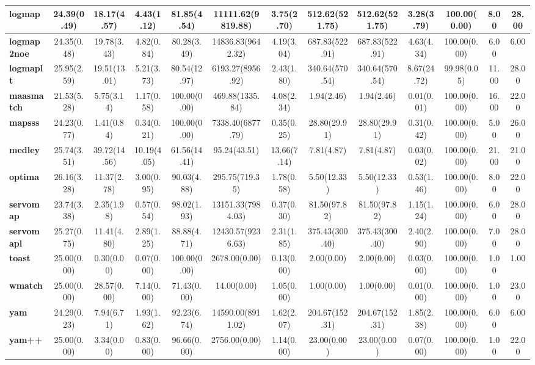 \begin{tabular}{|l|c|c|c|c|c|c|c|c|c|c|c|c|}
\textbf{logmap}&24.39(0.49)&18.17(4.57)&4.43(1.12)&81.85(4.54)&11111.62(9819.88)&3.75(2.70)&512.62(521.75)&512.62(521.75)&3.28(3.79)&100.00(0.00)&8.00&28.00\\\hline
\textbf{logmap2noe}&24.35(0.48)&19.78(3.43)&4.82(0.84)&80.28(3.49)&14836.83(9642.32)&4.19(3.04)&687.83(522.91)&687.83(522.91)&4.63(4.34)&100.00(0.00)&6.00&6.00\\\hline
\textbf{logmaplt}&25.95(2.59)&19.51(13.01)&5.21(3.73)&80.54(12.97)&6193.27(8956.92)&2.43(1.80)&340.64(570.54)&340.64(570.54)&8.67(24.72)&99.98(0.05)&11.00&28.00\\\hline
\textbf{maasmatch}&21.53(5.28)&5.75(3.14)&1.17(0.58)&100.00(0.00)&469.88(1335.84)&4.08(2.34)&1.94(2.46)&1.94(2.46)&0.01(0.01)&100.00(0.00)&16.00&22.00\\\hline
\textbf{mapsss}&24.23(0.77)&1.41(0.84)&0.34(0.21)&100.00(0.00)&7338.40(6877.79)&0.35(0.25)&28.80(29.91)&28.80(29.91)&0.31(0.42)&100.00(0.00)&5.00&26.00\\\hline
\textbf{medley}&25.74(3.51)&39.72(14.56)&10.19(4.05)&61.56(14.41)&95.24(43.51)&13.66(7.14)&7.81(4.87)&7.81(4.87)&0.03(0.02)&100.00(0.00)&21.00&21.00\\\hline
\textbf{optima}&26.16(3.28)&11.37(2.78)&3.00(0.95)&90.03(4.88)&295.75(719.35)&1.78(0.58)&5.50(12.33)&5.50(12.33)&0.53(1.46)&100.00(0.00)&8.00&22.00\\\hline
\textbf{servomap}&23.74(3.38)&2.35(1.98)&0.57(0.54)&98.02(1.93)&13151.33(7984.03)&0.37(0.30)&81.50(97.82)&81.50(97.82)&1.15(1.24)&100.00(0.00)&6.00&28.00\\\hline
\textbf{servomapl}&25.27(0.75)&11.41(4.80)&2.89(1.25)&88.88(4.71)&12430.57(9236.63)&2.31(1.85)&375.43(300.40)&375.43(300.40)&2.40(2.90)&100.00(0.00)&7.00&28.00\\\hline
\textbf{toast}&25.00(0.00)&0.30(0.00)&0.07(0.00)&100.00(0.00)&2678.00(0.00)&0.13(0.00)&2.00(0.00)&2.00(0.00)&0.03(0.00)&100.00(0.00)&1.00&1.00\\\hline
\textbf{wmatch}&25.00(0.00)&28.57(0.00)&7.14(0.00)&71.43(0.00)&14.00(0.00)&1.05(0.00)&1.00(0.00)&1.00(0.00)&0.01(0.00)&100.00(0.00)&1.00&23.00\\\hline
\textbf{yam}&24.29(0.23)&7.94(6.71)&1.93(1.62)&92.23(6.74)&14590.00(8911.02)&1.62(2.07)&204.67(152.31)&204.67(152.31)&1.85(2.38)&100.00(0.00)&6.00&6.00\\\hline
\textbf{yam++}&25.00(0.00)&3.34(0.00)&0.83(0.00)&96.66(0.00)&2756.00(0.00)&1.14(0.00)&23.00(0.00)&23.00(0.00)&0.07(0.00)&100.00(0.00)&1.00&22.00\\\hline
\end{tabular}
